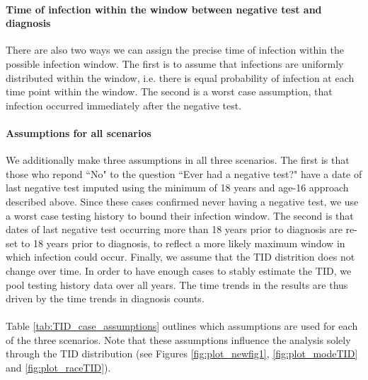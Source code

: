 \documentclass{article}\usepackage[]{graphicx}\usepackage[]{color}
\begin{document}
\paragraph{Time of infection within the window between negative test and diagnosis} There are also two ways we can assign the precise time of infection within the possible infection window. The first is to assume that infections are uniformly distributed within the window, i.e. there is equal probability of infection at each time point within the window. The second is a worst case assumption, that infection occurred immediately after the negative test.

\paragraph{Assumptions for all scenarios} We additionally make three assumptions in all three scenarios. The first is that those who repond ``No" to the question ``Ever had a negative test?" have a date of last negative test imputed using the minimum of 18 years and age-16 approach described above. Since these cases confirmed never having a negative test, we use a worst case testing history to bound their infection window. The second is that dates of last negative test occurring more than 18 years prior to diagnosis are re-set to 18 years prior to diagnosis, to reflect a more likely maximum window in which infection could occur. Finally, we assume that the TID distrition does not change over time. In order to have enough cases to stably estimate the TID, we pool testing history data over all years. The time trends in the results are thus driven by the time trends in diagnosis counts.

\paragraph{} Table \ref{tab:TID_case_assumptions} outlines which assumptions are used for each of the three scenarios. Note that these assumptions influence the analysis solely through the TID distribution (see Figures \ref{fig:plot_newfig1}, \ref{fig:plot_modeTID} and \ref{fig:plot_raceTID}).
\end{document}
